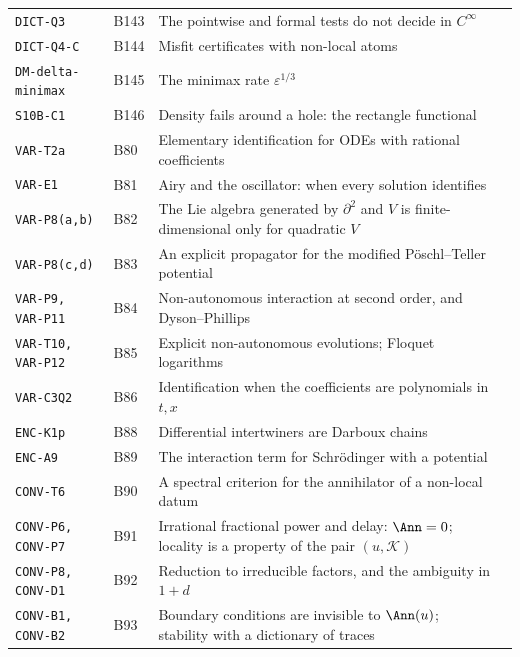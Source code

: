 \begin{center}
\begin{longtable}{@{}L{3.6cm}L{1.2cm}L{8.0cm}L{1.2cm}@{}}
\texttt{DICT-Q3} & B143 & The pointwise and formal tests do not decide in $C^\infty$ & \pageref{dim:DICT-Q3}\\
\texttt{DICT-Q4-C} & B144 & Misfit certificates with non-local atoms & \pageref{dim:DICT-Q4-C}\\
\texttt{DM-delta-minimax} & B145 & The minimax rate $\varepsilon^{1/3}$ & \pageref{dim:DM-delta-minimax}\\
\texttt{S10B-C1} & B146 & Density fails around a hole: the rectangle functional & \pageref{dim:S10B-C1}\\
\texttt{VAR-T2a} & B80 & Elementary identification for ODEs with rational coefficients & \pageref{dim:VAR-T2a}\\
\texttt{VAR-E1} & B81 & Airy and the oscillator: when every solution identifies & \pageref{dim:VAR-E1}\\
\texttt{VAR-P8(a,b)} & B82 & The Lie algebra generated by $\partial^2$ and $V$ is finite-dimensional only for quadratic $V$ & \pageref{dim:VAR-P8(a,b)}\\
\texttt{VAR-P8(c,d)} & B83 & An explicit propagator for the modified P\"oschl--Teller potential & \pageref{dim:VAR-P8(c,d)}\\
\texttt{VAR-P9, VAR-P11} & B84 & Non-autonomous interaction at second order, and Dyson--Phillips & \pageref{dim:VAR-P9, VAR-P11}\\
\texttt{VAR-T10, VAR-P12} & B85 & Explicit non-autonomous evolutions; Floquet logarithms & \pageref{dim:VAR-T10, VAR-P12}\\
\texttt{VAR-C3Q2} & B86 & Identification when the coefficients are polynomials in $t,x$ & \pageref{dim:VAR-C3Q2}\\
\texttt{ENC-K1p} & B88 & Differential intertwiners are Darboux chains & \pageref{dim:ENC-K1p}\\
\texttt{ENC-A9} & B89 & The interaction term for Schr\"odinger with a potential & \pageref{dim:ENC-A9}\\
\texttt{CONV-T6} & B90 & A spectral criterion for the annihilator of a non-local datum & \pageref{dim:CONV-T6}\\
\texttt{CONV-P6, CONV-P7} & B91 & Irrational fractional power and delay: $\Ann=0$; locality is a property of the pair $(u,\mathcal K)$ & \pageref{dim:CONV-P6, CONV-P7}\\
\texttt{CONV-P8, CONV-D1} & B92 & Reduction to irreducible factors, and the ambiguity in $1+d$ & \pageref{dim:CONV-P8, CONV-D1}\\
\texttt{CONV-B1, CONV-B2} & B93 & Boundary conditions are invisible to $\Ann(u)$; stability with a dictionary of traces & \pageref{dim:CONV-B1, CONV-B2}\\

\end{longtable}
\end{center}
